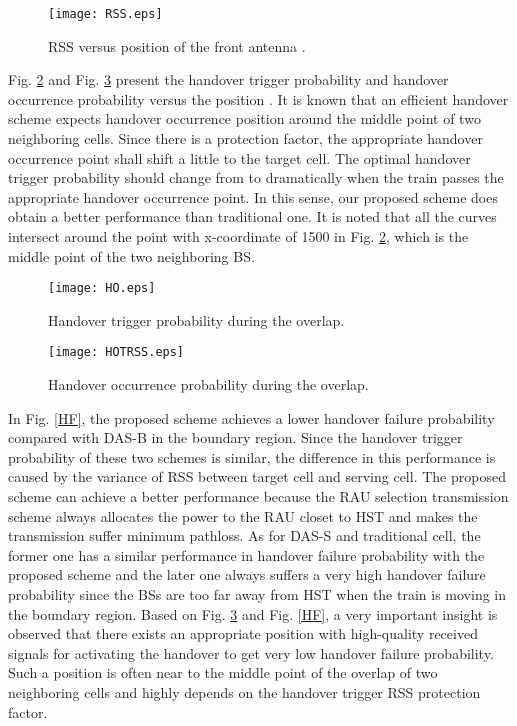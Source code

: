 \documentclass[a4paper,twocolumn,10pt]{IEEEtran}
\newcommand{\picspacec}{{\vspace{-0.1 in}}}
\begin{document}
\begin{figure}
\centering
\texttt{[image: RSS.eps]}
\caption{RSS versus position of the front antenna . }
\label{RSS}\picspacec
\end{figure}

Fig. \ref{HO} and Fig. \ref{HOT} present the handover trigger probability and handover occurrence probability versus the position . It is known that an efficient handover scheme expects handover occurrence position around the middle point of two neighboring cells. Since there is a protection factor, the appropriate handover occurrence point shall shift a little to the target cell. The optimal handover trigger probability should change from  to  dramatically when the train passes the appropriate handover occurrence point. In this sense, our proposed scheme does obtain a better performance than traditional one.
It is noted that all the  curves intersect around the point with x-coordinate of 1500 in Fig. \ref{HO}, which is the middle point of the two neighboring BS.


\begin{figure}
\centering
\texttt{[image: HO.eps]}
\caption{Handover trigger probability during the overlap.}
\label{HO}\picspacec
\end{figure}

\begin{figure}
\centering
\texttt{[image: HOTRSS.eps]}
\caption{Handover occurrence probability during the overlap.}
\label{HOT}\picspacec
\end{figure}

In Fig. \ref{HF}, the proposed scheme achieves a lower handover failure probability compared with DAS-B in the boundary region. Since the handover trigger probability of these two schemes is similar, the difference in this performance is caused by the variance of RSS between target cell and serving cell. The proposed scheme can achieve a better performance because the RAU selection transmission scheme always allocates the power to the RAU closet to HST and makes the transmission suffer minimum pathloss. As for DAS-S and traditional cell, the former one has a similar performance in handover failure probability with the proposed scheme and the later one always suffers a very high handover failure probability since the BSs are too far away from HST when the train is moving in the boundary region. Based on Fig. \ref{HOT} and Fig. \ref{HF}, a very important insight is observed that there exists an appropriate position with high-quality received signals for activating the handover to get very low handover failure probability. Such a position is often near to the middle point of the overlap of two neighboring cells and highly depends on the handover trigger RSS protection factor.
\end{document}
